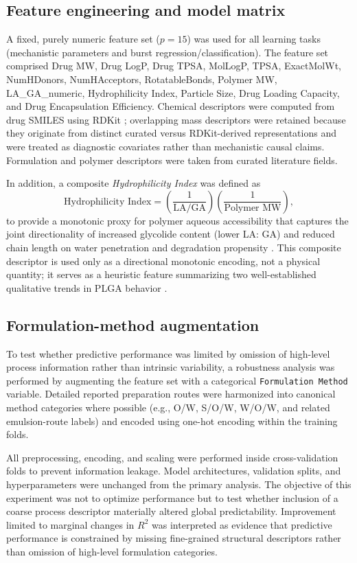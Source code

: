 \documentclass[preprint,12pt,authoryear]{elsarticle}
\begin{document}
\subsection{Feature engineering and model matrix}
A fixed, purely numeric feature set ($p=15$) was used for all learning tasks (mechanistic parameters and burst regression/classification). The feature set comprised Drug MW, Drug LogP, Drug TPSA, MolLogP, TPSA, ExactMolWt, NumHDonors, NumHAcceptors, RotatableBonds, Polymer MW, LA\_GA\_numeric, Hydrophilicity Index, Particle Size, Drug Loading Capacity, and Drug Encapsulation Efficiency. Chemical descriptors were computed from drug SMILES using RDKit \citep{RDKitZenodo}; overlapping mass descriptors were retained because they originate from distinct curated versus RDKit-derived representations and were treated as diagnostic covariates rather than mechanistic causal claims. Formulation and polymer descriptors were taken from curated literature fields.

In addition, a composite \textit{Hydrophilicity Index} was defined as
\begin{equation}
\text{Hydrophilicity Index} = \left(\frac{1}{\text{LA/GA}}\right)\left(\frac{1}{\text{Polymer MW}}\right),
\end{equation}
to provide a monotonic proxy for polymer aqueous accessibility that captures the joint directionality of increased glycolide content (lower LA: GA) and reduced chain length on water penetration and degradation propensity \citep{MakadiaSiegel2011, Fredenberg2011}. This composite descriptor is used only as a directional monotonic encoding, not a physical quantity; it serves as a heuristic feature summarizing two well-established qualitative trends in PLGA behavior \citep{MakadiaSiegel2011, Fredenberg2011}.

\subsection{Formulation-method augmentation}
To test whether predictive performance was limited by omission of high-level process information rather than intrinsic variability, a robustness analysis was performed by augmenting the feature set with a categorical \texttt{Formulation Method} variable. Detailed reported preparation routes were harmonized into canonical method categories where possible (e.g., O/W, S/O/W, W/O/W, and related emulsion-route labels) and encoded using one-hot encoding within the training folds.

All preprocessing, encoding, and scaling were performed inside cross-validation folds to prevent information leakage. Model architectures, validation splits, and hyperparameters were unchanged from the primary analysis. The objective of this experiment was not to optimize performance but to test whether inclusion of a coarse process descriptor materially altered global predictability. Improvement limited to marginal changes in $R^2$ was interpreted as evidence that predictive performance is constrained by missing fine-grained structural descriptors rather than omission of high-level formulation categories.
\end{document}
